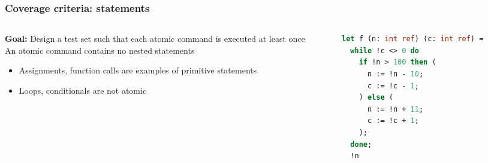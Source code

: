 \documentclass[10pt,xcolor={dvipsnames}]{beamer}
\begin{document}

\begin{frame}[fragile]

\frametitle{Coverage criteria: statements}

\begin{columns}
\begin{column}{0.45\textwidth}
\textbf{Goal:} Design a test set such that each atomic command is executed at least once
\\[1em]

\pause
An atomic command contains no nested statements
\begin{itemize}
\item Assignments, function calls are examples of primitive statements \\[0.5em]
\item Loops, conditionals are not atomic \\[0.5em]
\end{itemize}
\end{column}

\begin{column}{0.55\textwidth}
\pause
\begin{lstlisting}[language=Caml]
let f (n: int ref) (c: int ref) =   
  while !c <> 0 do
    if !n > 100 then (
      n := !n - 10;
      c := !c - 1;
    ) else (
      n := !n + 11;
      c := !c + 1;
    );    
  done;
  !n
\end{lstlisting}
\end{column}

\end{columns}

\end{frame}

\end{document}
